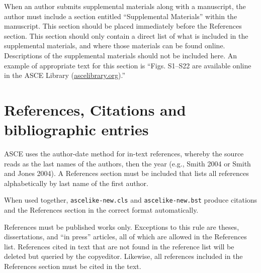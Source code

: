\documentclass[Journal,letterpaper]{ascelike-new}
\begin{document}
When an author submits supplemental materials along with a manuscript, the author must include a section entitled ``Supplemental Materials'' within the manuscript. This section should be placed immediately before the References section. This section should only contain a direct list of what is included in the supplemental materials, and where those materials can be found online. Descriptions of the supplemental materials should not be included here. An example of appropriate text for this section is ``Figs. S1–S22 are available online in the ASCE Library (\href{http://ascelibrary.org/}{ascelibrary.org}).''

\section{References, Citations and bibliographic entries}

ASCE uses the author-date method for in-text references, whereby the source reads as the last names of the authors, then the year (e.g., Smith 2004 or Smith and Jones 2004). A References section must be included that lists all references alphabetically by last name of the first author.

When used together, \texttt{ascelike-new.cls} and \texttt{ascelike-new.bst} produce citations and the References section in the correct format automatically.

References must be published works only. Exceptions to this rule are theses, dissertations, and ``in press'' articles, all of which are allowed in the References list. References cited in text that are not found in the reference list will be deleted but queried by the copyeditor. Likewise, all references included in the References section must be cited in the text.
\end{document}
